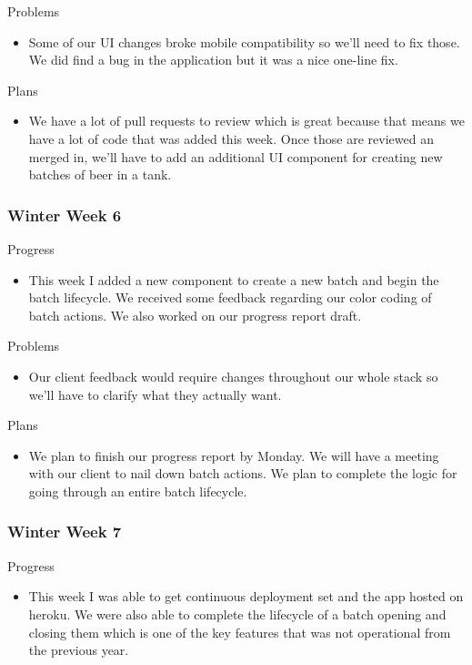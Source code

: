         \noindent
        Problems
        \begin{itemize}
            \item Some of our UI changes broke mobile compatibility so we'll need to fix those. We did find a bug in the application but it was a nice one-line fix.
        \end{itemize}
        
        \noindent
        Plans
        \begin{itemize}
            \item We have a lot of pull requests to review which is great because that means we have a lot of code that was added this week. Once those are reviewed an merged in, we'll have to add an additional UI component for creating new batches of beer in a tank.
        \end{itemize}
    \subsubsection{Winter Week 6}
        \noindent
        Progress
        \begin{itemize}
            \item This week I added a new component to create a new batch and begin the batch lifecycle. We received some feedback regarding our color coding of batch actions. We also worked on our progress report draft.
        \end{itemize}
        
        \noindent
        Problems
        \begin{itemize}
            \item Our client feedback would require changes throughout our whole stack so we'll have to clarify what they actually want.
        \end{itemize}
        
        \noindent
        Plans
        \begin{itemize}
            \item We plan to finish our progress report by Monday. We will have a meeting with our client to nail down batch actions. We plan to complete the logic for going through an entire batch lifecycle.
        \end{itemize}
    \subsubsection{Winter Week 7}
        \noindent
        Progress
        \begin{itemize}
            \item This week I was able to get continuous deployment set and the app hosted on heroku. We were also able to complete the lifecycle of a batch opening and closing them which is one of the key features that was not operational from the previous year.
        \end{itemize}
        
